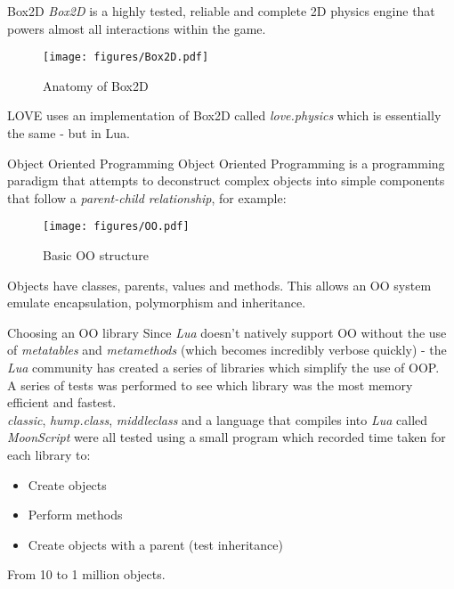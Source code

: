 \documentclass{beamer}
\begin{document}

\begin{frame}{Box2D}
  \textit{Box2D} is a highly tested, reliable and complete 2D physics engine that powers almost all interactions within the game.
  \begin{figure}[t]
  \texttt{[image: figures/Box2D.pdf]}
  \caption{Anatomy of Box2D}
  \label{fig:box2-explained}
  \end{figure}
  \vspace*{-0.7cm}
  
  LOVE uses an implementation of Box2D called \textit{love.physics} which is essentially the same - but in Lua.
\end{frame}

\begin{frame}{Object Oriented Programming}
  Object Oriented Programming is a programming paradigm that attempts to deconstruct complex objects into simple components that follow a \textit{parent-child relationship}, for example:
    
  \begin{figure}[t]
  \texttt{[image: figures/OO.pdf]}
  \caption{Basic OO structure}
  \label{fig:box2-explained}
  \end{figure}
  \vspace*{-0.7cm}
  
Objects have classes, parents, values and methods. This allows an OO system emulate encapsulation, polymorphism and inheritance. 
\end{frame}


\begin{frame}{Choosing an OO library}
  Since \textit{Lua} doesn't natively support OO without the use of \textit{metatables} and \textit{metamethods} (which becomes incredibly verbose quickly) - the \textit{Lua} community has created a series of libraries which simplify the use of OOP. \\
    
  A series of tests was performed to see which library was the most memory efficient and fastest. \\

  \textit{classic}, \textit{hump.class}, \textit{middleclass} and a language that compiles into \textit{Lua} called \textit{MoonScript} were all tested using a small program which recorded time taken for each library to:
  \begin{itemize}
    \item Create objects
    \item Perform methods
    \item Create objects with a parent (test inheritance)
  \end{itemize}
  From 10 to 1 million objects.
\end{frame}
\end{document}
